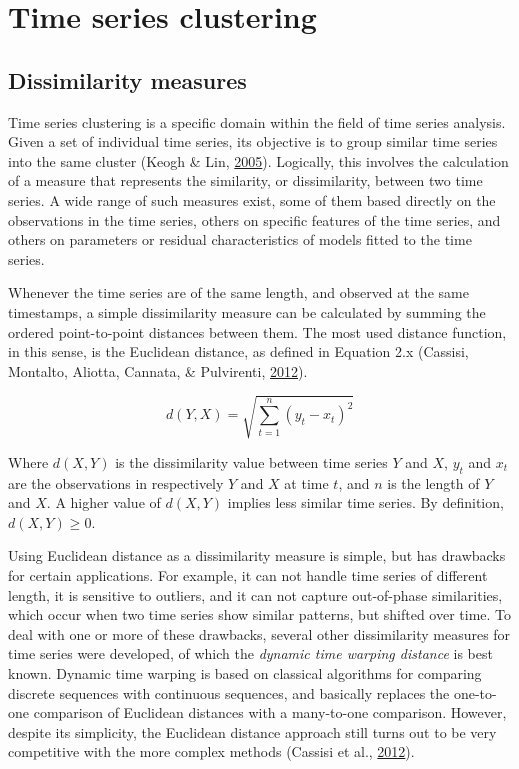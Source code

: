 \documentclass[12pt,oneside]{reedthesis}
\begin{document}
\section{Time series clustering}\label{time-series-clustering}

\subsection{Dissimilarity measures}\label{dissimilarity-measures}

Time series clustering is a specific domain within the field of time
series analysis. Given a set of individual time series, its objective is
to group similar time series into the same cluster (Keogh \& Lin,
\protect\hyperlink{ref-keogh2005}{2005}). Logically, this involves the
calculation of a measure that represents the similarity, or
dissimilarity, between two time series. A wide range of such measures
exist, some of them based directly on the observations in the time
series, others on specific features of the time series, and others on
parameters or residual characteristics of models fitted to the time
series.

Whenever the time series are of the same length, and observed at the
same timestamps, a simple dissimilarity measure can be calculated by
summing the ordered point-to-point distances between them. The most used
distance function, in this sense, is the Euclidean distance, as defined
in Equation 2.x (Cassisi, Montalto, Aliotta, Cannata, \& Pulvirenti,
\protect\hyperlink{ref-cassisi2012}{2012}).

\[ d(Y,X) = \sqrt{\sum_{t=1}^{n}(y_{t}-x_{t})^{2}} \]

Where \(d(X,Y)\) is the dissimilarity value between time series \(Y\)
and \(X\), \(y_{t}\) and \(x_{t}\) are the observations in respectively
\(Y\) and \(X\) at time \(t\), and \(n\) is the length of \(Y\) and
\(X\). A higher value of \(d(X,Y)\) implies less similar time series. By
definition, \(d(X,Y) \geq 0\).

Using Euclidean distance as a dissimilarity measure is simple, but has
drawbacks for certain applications. For example, it can not handle time
series of different length, it is sensitive to outliers, and it can not
capture out-of-phase similarities, which occur when two time series show
similar patterns, but shifted over time. To deal with one or more of
these drawbacks, several other dissimilarity measures for time series
were developed, of which the \emph{dynamic time warping distance} is
best known. Dynamic time warping is based on classical algorithms for
comparing discrete sequences with continuous sequences, and basically
replaces the one-to-one comparison of Euclidean distances with a
many-to-one comparison. However, despite its simplicity, the Euclidean
distance approach still turns out to be very competitive with the more
complex methods (Cassisi et al.,
\protect\hyperlink{ref-cassisi2012}{2012}).
\end{document}
